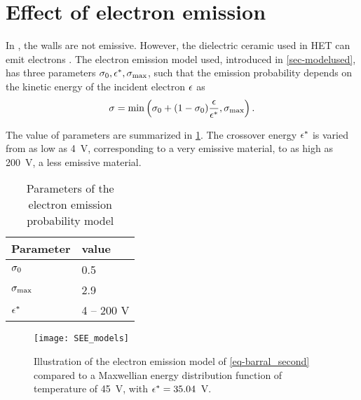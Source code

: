 
\section{Effect of electron emission}
  \label{sec-see}
  
  In , the walls are not emissive.
  However, the dielectric ceramic used in \ac{HET} can emit electrons \citep{villemant2018,barral2003a}.
  The electron emission model used, introduced in \cref{sec-modelused}, has three parameters $\sigma _0, \epsilon^{*}, \sigma _{\rm max} $, such that the emission probability depends on the kinetic energy of the incident electron $\epsilon$ as
  \begin{equation} \label{eq-barral_second}
    \sigma  = \min \left( \sigma _0 + (1 -  \sigma _0) \frac{\epsilon}{\epsilon^{*}}, \sigma _{\rm max}     \right).
  \end{equation}
  
  The value of parameters are summarized in \cref{tab-tabe_parameters_see}.
  The crossover energy $\epsilon^{*}$ is varied from as low as 4~V, corresponding to a very emissive material, to as high as 200~V, a less emissive material.
  
  \begin{table}[hbt]
    \centering
    \caption{Parameters of the electron emission probability model}
    \label{tab-tabe_parameters_see}
    \begin{tabular}{@{}ll@{}} \toprule
    Parameter & value  \\ \midrule
    $\sigma _0$ & 0.5  \\
    $\sigma _{\rm max} $ & 2.9 \\
    $\epsilon^{*}$   &  4  -- 200 V\\
    \bottomrule
    \end{tabular}
  \end{table}
  
  \begin{figure}[hbt]
    \centering
    \texttt{[image: SEE\_models]}
    \caption{Illustration of the electron emission model of \cref{eq-barral_second} compared to a Maxwellian energy distribution function of temperature of 45~V, with $\epsilon^{*}=35.04$~V.}
    \label{fig-see_illustration}
  \end{figure}
  
